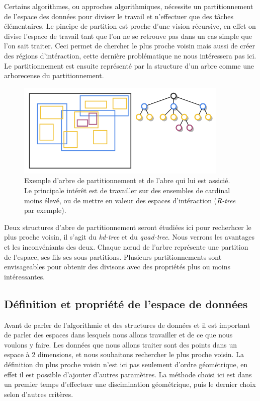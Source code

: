 Certains algorithmes, ou approches algorithmiques, nécessite un partitionnement de l'espace des données pour diviser le travail et n'effectuer que des tâches élémentaires. Le pincipe de partition est proche d'une vision récursive, en effet on divise l'espace de travail tant que l'on ne se retrouve pas dans un cas simple que l'on sait traiter. Ceci permet de chercher le plus proche voisin mais aussi de créer des régions d'intéraction, cette dernière problématique ne nous intéressera pas ici. Le partitionnement est ensuite représenté par la structure d'un arbre comme une arborecense du partitionnement.

	\begin{figure}[h]
		\centering
		\includegraphics[width=0.9\textwidth]{img/rtree.png}
		\caption[Exemple de partitionnement et d'arbre associé]{Exemple d'arbre de partitionnement et de l'abre qui lui est assicié. Le principale intérêt est de travailler sur des ensembles de cardinal moins élevé, ou de mettre en valeur des espaces d'intéraction (\emph{R-tree} par exemple).}
	\end{figure}

Deux structures d'abre de partitionnement seront étudiées ici pour recherhcer le plus proche voisin, il s'agit du \emph{kd-tree} et du \emph{quad-tree}. Nous verrons les avantages et les inconvéniants des deux. Chaque n\oe{}ud de l'arbre représente une partition de l'espace, ses fils ses sous-partitions. Plusieurs partitionnements sont envisageables pour obtenir des divisons avec des propriétés plus ou moins intéressantes.


	\subsection{Définition et propriété de l'espace de données}

Avant de parler de l'algorithmie et des structures de données et il est important de parler des espaces dans lesquels nous allons travailler et de ce que nous voulons y faire. Les données que nous allons traiter sont des points dans un espace à 2 dimensions, et nous souhaitons rechercher le plus proche voisin. La définition du plus proche voisin n'est ici pas seulement d'ordre géométrique, en effet il est possible d'ajouter d'autres paramètres. La méthode choisi ici est dans un premier temps d'effectuer une discimination géométrique, puis le dernier choix selon d'autres critères.


